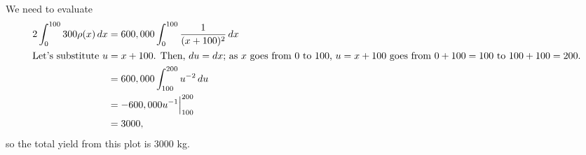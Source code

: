 \documentclass{article}
\begin{document}
\begin{enumerate}
\begin{enumerate}
    \begin{solution}
      We need to evaluate
      \begin{align*}
        2 \int_0^{100} 300 \rho(x)\,dx &= 600,000 \int_0^{100} \frac{1}{(x
          + 100)^2}\,dx \\
        \intertext{Let's substitute $u = x + 100$.  Then, $du = dx$; as
          $x$ goes from $0$ to $100$, $u = x + 100$ goes from $0 + 100 =
          100$ to $100 + 100 = 200$.}
        &= 600,000 \int_{100}^{200} u^{-2}\,du \\
        &= -600,000 u^{-1} \Big|_{100}^{200} \\
        &= 3000,
      \end{align*}
      so the total yield from this plot is $3000$ kg. 
    \end{solution}

  \end{enumerate}







\end{enumerate}
\end{document}
